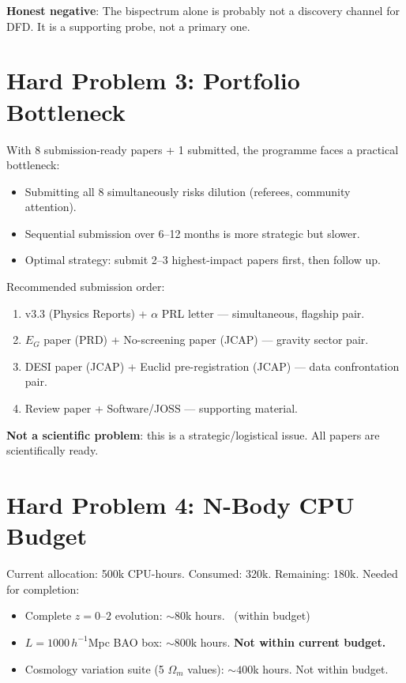 \documentclass[11pt,a4paper]{article}
\begin{document}
\textbf{Honest negative}: The bispectrum alone is probably not a discovery channel for DFD. It is a supporting probe, not a primary one.

\section{Hard Problem 3: Portfolio Bottleneck}

With 8 submission-ready papers + 1 submitted, the programme faces a practical bottleneck:
\begin{itemize}[nosep]
\item Submitting all 8 simultaneously risks dilution (referees, community attention).
\item Sequential submission over 6--12 months is more strategic but slower.
\item Optimal strategy: submit 2--3 highest-impact papers first, then follow up.
\end{itemize}

Recommended submission order:
\begin{enumerate}[nosep]
\item v3.3 (Physics Reports) + $\alpha$ PRL letter --- simultaneous, flagship pair.
\item $E_G$ paper (PRD) + No-screening paper (JCAP) --- gravity sector pair.
\item DESI paper (JCAP) + Euclid pre-registration (JCAP) --- data confrontation pair.
\item Review paper + Software/JOSS --- supporting material.
\end{enumerate}

\textbf{Not a scientific problem}: this is a strategic/logistical issue. All papers are scientifically ready.

\section{Hard Problem 4: N-Body CPU Budget}

Current allocation: 500k CPU-hours. Consumed: 320k. Remaining: 180k. Needed for completion:
\begin{itemize}[nosep]
\item Complete $z = 0$--$2$ evolution: $\sim 80$k hours. \checkmark\ (within budget)
\item $L = 1000\,h^{-1}$Mpc BAO box: $\sim 800$k hours. \textbf{Not within current budget.}
\item Cosmology variation suite (5 $\Omega_m$ values): $\sim 400$k hours. Not within budget.
\end{itemize}
\end{document}
